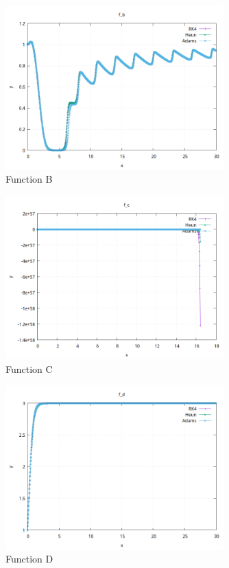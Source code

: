 \documentclass[12pt]{article}
\begin{document}
\begin{figure}[ht]
    \centering
    \includegraphics[width=0.75\textwidth]{./../problem2/data/f_b.png}
    \caption{Function B}
    \label{fig:fncB}
\end{figure}

\begin{figure}[ht]
    \centering
    \includegraphics[width=0.75\textwidth]{./../problem2/data/f_c.png}
    \caption{Function C}
    \label{fig:fncC}
\end{figure}

\begin{figure}[ht]
    \centering
    \includegraphics[width=0.75\textwidth]{./../problem2/data/f_d.png}
    \caption{Function D}
    \label{fig:fncD}
\end{figure}
\end{document}
